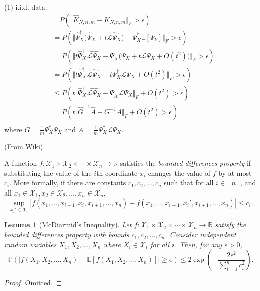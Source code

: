 \documentclass{article}[11]
\newtheorem{lemma}[theorem]{Lemma}
\begin{document}
	(1) i.i.d. data:
	\begin{align*}
		&\quad P\left(\Vert \widehat{K}_{N,n,m} - K_{N,n,m} \Vert_F > \epsilon \right) \\
		&= P\left(\Vert \widehat{\Psi}_X^{\dagger}\big(\widehat{\Psi}_X + t \widehat{\mathcal{L}\Psi_X} \big) - \Psi_X^{\dagger}\mathbb{E}[\Psi_Y] \Vert_F > \epsilon \right) \\
		&= P\left(\Vert t\widehat{\Psi}_X^{\dagger} \widehat{\mathcal{L}\Psi_X} - \Psi_X^{\dagger} \big(\Psi_X + t\mathcal{L}\Psi_{X} + O(t^2) \big) \Vert_F > \epsilon \right) \\
		&= P\left(\Vert t\widehat{\Psi}_X^{\dagger} \widehat{\mathcal{L}\Psi_X} - t\Psi_X^{\dagger}\mathcal{L}\Psi_{X} + O(t^2) \Vert_F > \epsilon \right) \\
		&\leq P\left( t\Vert \widehat{\Psi}_X^{\dagger} \widehat{\mathcal{L}\Psi_X} - \Psi_X^{\dagger}\mathcal{L}\Psi_{X} \Vert_F + O(t^2) > \epsilon \right) \\
		&= P\left( t\Vert \widehat{G}^{-1} \widehat{A} - G^{-1}A \Vert_F + O(t^2) > \epsilon \right) \\
	\end{align*}
	where $G = \frac{1}{m}\Psi_X^* \Psi_X$ and $A = \frac{1}{m}\Psi_X^* \mathcal{L}\Psi_{X}$.
	
	(From Wiki)
	
	A function $f : \mathcal{X}_1 \times \mathcal{X}_2 \times \cdots \times \mathcal{X}_n \to \mathbb{R}$ satisfies the \textit{bounded differences property} if substituting the value of the $i$th coordinate $x_i$ changes the value of $f$ by at most $c_i$. More formally, if there are constants $c_1, c_2, \ldots, c_n$ such that for all $i \in [n]$, and all $x_1 \in \mathcal{X}_1, x_2 \in \mathcal{X}_2, \ldots, x_n \in \mathcal{X}_n$,
	\[
	\sup_{x_i' \in \mathcal{X}_i} |f(x_1, \ldots, x_{i-1}, x_i, x_{i+1}, \ldots, x_n) - f(x_1, \ldots, x_{i-1}, x_i', x_{i+1}, \ldots, x_n)| \leq c_i.
	\]
	
	
	\begin{lemma}[McDiarmid's Inequality]\label{McDiarmid}
		Let $f : \mathcal{X}_1 \times \mathcal{X}_2 \times \cdots \times \mathcal{X}_n \to \mathbb{R}$ satisfy the bounded differences property with bounds $c_1, c_2, \ldots, c_n$. Consider independent random variables $X_1, X_2, \ldots, X_n$ where $X_i \in \mathcal{X}_i$ for all $i$. Then, for any $\epsilon > 0$,
		\[
		\mathbb{P}(|f(X_1, X_2, \ldots, X_n) - \mathbb{E}[f(X_1, X_2, \ldots, X_n)]| \geq \epsilon) \leq 2 \exp\left( - \frac{2\epsilon^2}{\sum_{i=1}^n c_i^2} \right).
		\]
	\end{lemma}
	\begin{proof}
		Omitted.
	\end{proof}
	
\end{document}
